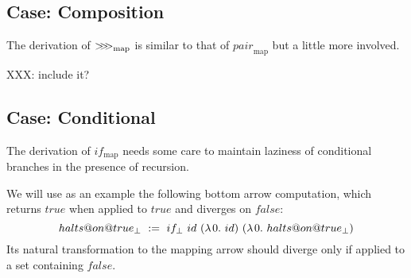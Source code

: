 \documentclass[preprint]{sigplanconf}
\newcommand{\arrowcomp}{\ensuremath{{>}\mspace{-6mu}{>}\mspace{-6mu}{>}}}
\newcommand{\arrowpair}{\ensuremath{pair}}
\newcommand{\arrowif}{\ensuremath{if}}
\newcommand{\ifbot}{\arrowif_\bot}
\newcommand{\map}{_\mathrm{map}}
\newcommand{\compmap}{\arrowcomp\map}
\newcommand{\pairmap}{\arrowpair\map}
\newcommand{\ifmap}{\arrowif\map}
\begin{document}
\subsection{Case: Composition}

The derivation of $\compmap$ is similar to that of $\pairmap$ but a little more involved.

XXX: include it?

\subsection{Case: Conditional}

The derivation of $\ifmap$ needs some care to maintain laziness of conditional branches in the presence of recursion.

We will use as an example the following bottom arrow computation, which returns $true$ when applied to $true$ and diverges on $false$:
\begin{equation}
	halts@on@true_\bot \ := \ \ifbot~id~(\fun{0}{id})~(\fun{0}{halts@on@true_\bot})
\end{equation}
Its natural transformation to the mapping arrow should diverge only if applied to a set containing $false$.
\end{document}
